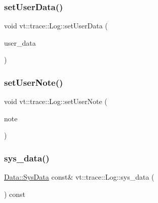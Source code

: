 \subsubsection{\texorpdfstring{set\+User\+Data()}{setUserData()}}
{\footnotesize\ttfamily void vt\+::trace\+::\+Log\+::set\+User\+Data (\begin{DoxyParamCaption}\item[{\hyperlink{structvt_1_1trace_1_1_log_af392c3825bf45d286a0f77bddf7a96cf}{User\+Data\+Type}}]{user\+\_\+data }\end{DoxyParamCaption})\hspace{0.3cm}{\ttfamily [inline]}}

\mbox{\label{structvt_1_1trace_1_1_log_a823483c0dc5480368e03e89774a0ae9d}} 
\subsubsection{\texorpdfstring{set\+User\+Note()}{setUserNote()}}
{\footnotesize\ttfamily void vt\+::trace\+::\+Log\+::set\+User\+Note (\begin{DoxyParamCaption}\item[{std\+::string const \&}]{note }\end{DoxyParamCaption})\hspace{0.3cm}{\ttfamily [inline]}}

\mbox{\label{structvt_1_1trace_1_1_log_a082937c397ac5b47ffc9089ff94698f0}} 
\subsubsection{\texorpdfstring{sys\+\_\+data()}{sys\_data()}}
{\footnotesize\ttfamily \hyperlink{structvt_1_1trace_1_1_log_1_1_data_1_1_sys_data}{Data\+::\+Sys\+Data} const\& vt\+::trace\+::\+Log\+::sys\+\_\+data (\begin{DoxyParamCaption}{ }\end{DoxyParamCaption}) const\hspace{0.3cm}{\ttfamily [inline]}}

\mbox{\label{structvt_1_1trace_1_1_log_a7b251bc7dcebcbbafa29cc2ca6ea4c12}} 
